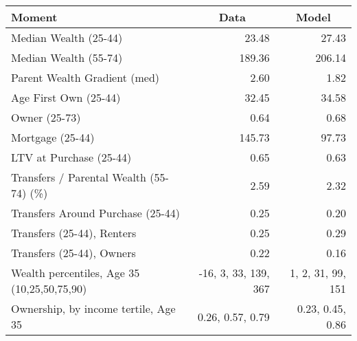 \begin{tabular}{lrr}
\toprule
\multicolumn{1}{l}{Moment} & \multicolumn{1}{c}{Data} & \multicolumn{1}{c}{Model}\\
\midrule
Median Wealth (25-44) & 23.48 & 27.43\\
Median Wealth (55-74) & 189.36 & 206.14\\
Parent Wealth Gradient (med) & 2.60 & 1.82\\
Age First Own (25-44) & 32.45 & 34.58\\
Owner (25-73) & 0.64 & 0.68\\
Mortgage (25-44) & 145.73 & 97.73\\
LTV at Purchase (25-44) & 0.65 & 0.63\\
Transfers / Parental Wealth (55-74) (\%) & 2.59 & 2.32\\
Transfers Around Purchase (25-44) & 0.25 & 0.20\\
Transfers (25-44), Renters & 0.25 & 0.29\\
Transfers (25-44), Owners & 0.22 & 0.16\\
Wealth percentiles, Age 35 (10,25,50,75,90) & -16, 3, 33, 139, 367 & 1, 2, 31, 99, 151  \\ 
Ownership, by income tertile, Age 35 & 0.26, 0.57, 0.79 & 0.23, 0.45, 0.86  \\ 
\bottomrule
\end{tabular}
